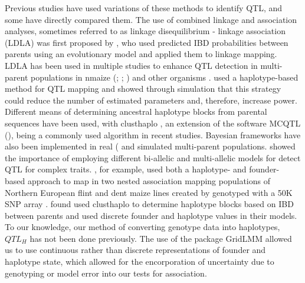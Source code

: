 \documentclass[article,9pt,twocolumn,twoside]{rilabRxiv}
\begin{document}
Previous studies have used variations of these methods to identify QTL, and some have directly compared them.
The use of combined linkage and association analyses, sometimes referred to as linkage disequilibrium - linkage association (LDLA) was first proposed by \cite{Meuwissen}, who used predicted IBD probabilities between parents using an evolutionary model and applied them to linkage mapping.
LDLA has been used in multiple studies to enhance QTL detection in multi-parent populations in nmaize (\cite{Giraud2};  \cite{Yu2}; \cite{McMullen}) and other organisms \cite{Herault}.
\cite{Jansen} used a haplotype-based method for QTL mapping and showed through simulation that this strategy could reduce the number of estimated parameters and, therefore, increase power.
Different means of determining ancestral haplotype blocks from parental sequences have been used, with clusthaplo \cite{Leroux}, an extension of the software MCQTL (\cite{Jourjon}), being a commonly used algorithm in recent studies.
Bayesian frameworks have also been implemented in real (\cite{PerezEnciso} and simulated \cite{Bink} multi-parent populations.
\cite{Bardol} showed the importance of employing different bi-allelic and multi-allelic models for detect QTL for complex traits.
\citet{Giraud}, for example, used both a haplotype- and founder- based approach to map in two nested association mapping populations of Northern European flint and dent maize lines created by \citep{Bauer} genotyped with a 50K SNP array \cite{Ganal}.
\citet{Giraud} found used clusthaplo to determine haplotype blocks based on IBD between parents and used discrete founder and haplotype values in their models.
To our knowledge, our method of converting genotype data into haplotypes, $QTL_H$ has not been done previously.
The use of the package GridLMM \cite{Runcie} allowed us to use continuous rather than discrete representations of founder and haplotype state, which allowed for the encorporation of uncertainty due to genotyping or model error into our tests for association.
\end{document}
